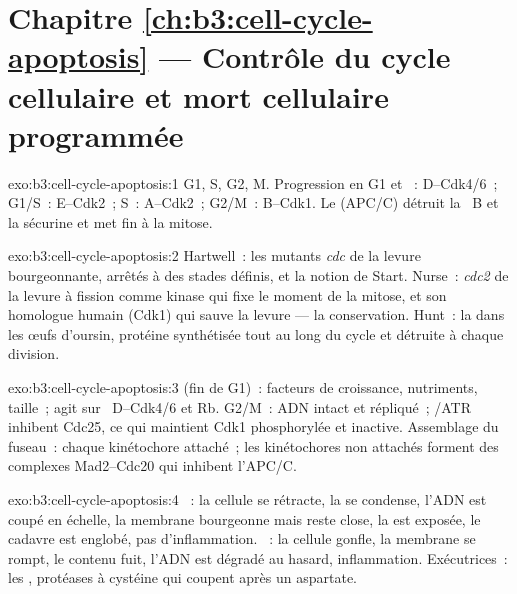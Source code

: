 \section*{Chapitre \ref{ch:b3:cell-cycle-apoptosis} --- Contrôle du cycle cellulaire et mort cellulaire programmée}

\begin{solution}{exo:b3:cell-cycle-apoptosis:1}
G1, S, G2, M. Progression en G1 et ~: 
D--Cdk4/6~; G1/S~:  E--Cdk2~; S~:  A--Cdk2~; G2/M~:
 B--Cdk1. Le  (APC/C) détruit la
~B et la sécurine et met fin à la mitose.
\end{solution}

\begin{solution}{exo:b3:cell-cycle-apoptosis:2}
Hartwell~: les mutants \emph{cdc} de la levure bourgeonnante, arrêtés à
des stades définis, et la notion de Start. Nurse~: \emph{cdc2} de la
levure à fission comme kinase qui fixe le moment de la mitose, et son
homologue humain (Cdk1) qui sauve la levure --- la conservation.
Hunt~: la  dans les œufs d'oursin, protéine synthétisée tout au
long du cycle et détruite à chaque division.
\end{solution}

\begin{solution}{exo:b3:cell-cycle-apoptosis:3}
 (fin de G1)~: facteurs de croissance, nutriments,
taille~; agit sur ~D--Cdk4/6 et Rb. G2/M~: ADN intact et
répliqué~; /ATR inhibent Cdc25, ce qui maintient Cdk1 phosphorylée
et inactive. Assemblage du fuseau~: chaque kinétochore attaché~; les
kinétochores non attachés forment des complexes Mad2--Cdc20 qui
inhibent l'APC/C.
\end{solution}

\begin{solution}{exo:b3:cell-cycle-apoptosis:4}
~: la cellule se rétracte, la  se condense, l'ADN est
coupé en échelle, la membrane bourgeonne mais reste close, la
 est exposée, le cadavre est englobé, pas
d'inflammation. ~: la cellule gonfle, la membrane se rompt, le
contenu fuit, l'ADN est dégradé au hasard, inflammation. Exécutrices~:
les , protéases à cystéine qui coupent après un aspartate.
\end{solution}

